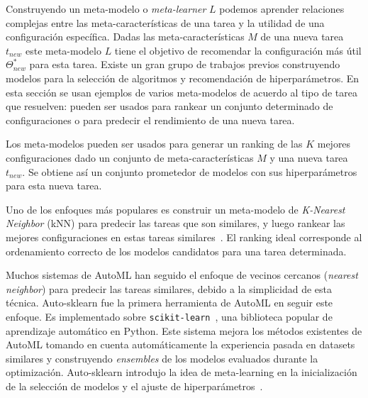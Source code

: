 \documentclass[a4paper,12pt]{article}
\begin{document}
Construyendo un meta-modelo o \textit{meta-learner} $L$ podemos aprender relaciones complejas entre las meta-características de una tarea y la utilidad de una configuración específica. Dadas las meta-características $M$ de una nueva tarea $t_{new}$ este meta-modelo $L$ tiene el objetivo de recomendar la configuración más útil $\Theta_{new}^*$ para esta tarea. Existe un gran grupo de trabajos previos construyendo modelos para la selección de algoritmos y recomendación de hiperparámetros. En esta sección se usan ejemplos de varios meta-modelos de acuerdo al tipo de tarea que resuelven: pueden ser usados para rankear un conjunto determinado de configuraciones o para predecir el rendimiento de una nueva tarea.

Los meta-modelos pueden ser usados para generar un ranking de las $K$ mejores configuraciones dado un conjunto de meta-características $M$ y una nueva tarea $t_{new}$. Se obtiene así un conjunto prometedor de modelos con sus hiperparámetros para esta nueva tarea.
 
Uno de los enfoques más populares es construir un meta-modelo de \textit{K-Nearest Neighbor} (kNN) para predecir las tareas que son similares, y luego rankear las mejores configuraciones en estas tareas similares~\cite{santos2004selection, bradzil2003ranking}. 
El ranking ideal corresponde al ordenamiento correcto de los modelos candidatos para una tarea determinada.

Muchos sistemas de AutoML han seguido el enfoque de vecinos cercanos (\textit{nearest neighbor}) para predecir las tareas similares, debido a la simplicidad de esta técnica. Auto-sklearn \cite{fuerer2015efficient} fue la primera herramienta de AutoML en seguir este enfoque. Es implementado sobre \texttt{scikit-learn}~\cite{scikit-learn}, una biblioteca popular de aprendizaje automático en Python. 
Este sistema mejora los métodos existentes de AutoML tomando en cuenta automáticamente la experiencia pasada en datasets similares y construyendo \textit{ensembles} de los modelos evaluados durante la optimización. Auto-sklearn introdujo la idea de meta-learning en la inicialización de la selección de modelos y el ajuste de hiperparámetros~\cite{vanschoren2018metalearning}.
\end{document}
